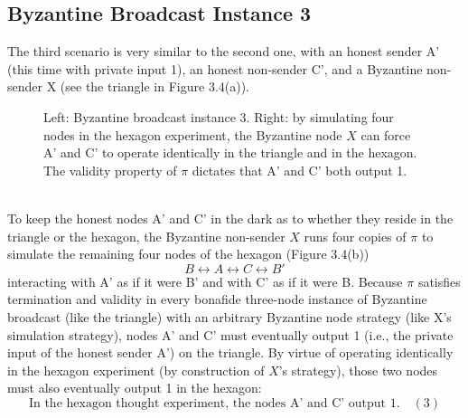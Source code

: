 \subsection{Byzantine Broadcast Instance 3}
The third scenario is very similar to the second one, with an honest sender A'
(this time with private input 1), an honest non-sender C', and a Byzantine non-sender X (see the triangle in Figure 3.4(a)).
\begin{figure}[h]
    \centering
    \qquad
    \caption{Left: Byzantine broadcast instance 3. Right: by simulating four nodes in the
    hexagon experiment, the Byzantine node $X$ can force A' and C' to operate identically in
    the triangle and in the hexagon. The validity property of $\pi$ dictates that A' and C' both
    output 1.}
    \label{fig:example}%
\end{figure}\\

To keep the honest nodes A' and C' in the dark as to whether they reside in the triangle
or the hexagon, the Byzantine non-sender $X$ runs four copies of $\pi$ to simulate the remaining
four nodes of the hexagon (Figure 3.4(b))
$$B \leftrightarrow A \leftrightarrow C \leftrightarrow B'$$
interacting with A' as if it were B' and with C' as if it were B.
Because $\pi$ satisfies termination and validity in every bonafide three-node instance of
Byzantine broadcast (like the triangle) with an arbitrary Byzantine node strategy (like X’s
simulation strategy), nodes A' and C' must eventually output 1 (i.e., the private input of
the honest sender A') on the triangle. By virtue of operating identically in the hexagon
experiment (by construction of $X$’s strategy), those two nodes must also eventually output 1
in the hexagon:
$$\text{In the hexagon thought experiment, the nodes A' and C' output 1.} \quad (3)$$

